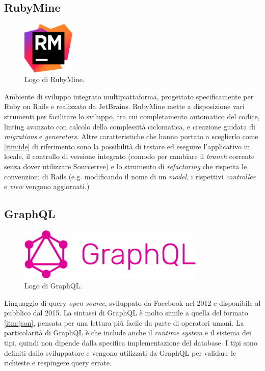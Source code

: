\subsection{RubyMine}
\begin{figure}[h!]
    \centering
    \includegraphics[height=2.5cm]{figures/rubymine.png}
    \caption[Logo di RubyMine]{Logo di RubyMine.
    \label{fig:rmine}}
\end{figure}
Ambiente di sviluppo integrato multipiattaforma, progettato specificamente per Ruby on Rails e realizzato da JetBrains. RubyMine mette a disposizione vari strumenti per facilitare lo sviluppo, tra cui completamento automatico del codice, linting avanzato con calcolo della complessità ciclomatica, e creazione guidata di \textit{migrations} e \textit{generators}. Altre caratteristiche che hanno portato a sceglierlo come \ref{itm:ide} di riferimento sono la possibilità di testare ed eseguire l'applicativo in locale, il controllo di versione integrato (comodo per cambiare il \textit{branch} corrente senza dover utilizzare Sourcetree) e lo strumento di \textit{refactoring} che rispetta le convenzioni di Rails (e.g. modificando il nome di un \textit{model}, i rispettivi \textit{controller} e \textit{view} vengono aggiornati.) 

\subsection{GraphQL}
\begin{figure}[h!]
    \centering
    \includegraphics[height=2.5cm]{figures/graphql.png}
    \caption[Logo di GraphQL]{Logo di GraphQL.
    \label{fig:graphql}}
\end{figure}
Linguaggio di query \textit{open source}, sviluppato da Facebook nel 2012 e disponibile al pubblico dal 2015. La sintassi di GraphQL è molto simile a quella del formato \ref{itm:json}, pensata per una lettura più facile da parte di operatori umani. La particolarità di GraphQL è che include anche il \textit{runtime system} e il sistema dei tipi, quindi non dipende dalla specifica implementazione del database. I tipi sono definiti dallo sviluppatore e vengono utilizzati da GraphQL per validare le richieste e respingere query errate.

